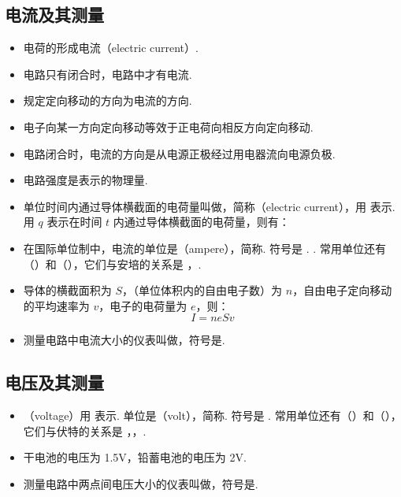 \subsection{电流及其测量}
\vspace{10pt}
\begin{itemize}
\item 电荷的形成电流（electric current）.
\item 电路只有闭合时，电路中才有电流.
\item 规定定向移动的方向为电流的方向.
\item 电子向某一方向定向移动等效于正电荷向相反方向定向移动.
\item 电路闭合时，电流的方向是从电源正极经过用电器流向电源负极.
\item 电路强度是表示的物理量.
\item 单位时间内通过导体横截面的电荷量叫做，简称（electric current），用  表示. 用 $q$ 表示在时间 $t$ 内通过导体横截面的电荷量，则有：
\item 在国际单位制中，电流的单位是（ampere），简称. 符号是 . . 常用单位还有（）和（），它们与安培的关系是 ，.
\item 导体的横截面积为 $S$，（单位体积内的自由电子数）为 $n$，自由电子定向移动的平均速率为 $v$，电子的电荷量为 $e$，则：
$$
I=neSv
$$
\item 测量电路中电流大小的仪表叫做，符号是\ammeter.
\end{itemize}

\subsection{电压及其测量}
\vspace{10pt}
\begin{itemize}
\item {}（voltage）用  表示. 单位是（volt），简称. 符号是 . 常用单位还有（）和（），它们与伏特的关系是 ，，.
\item 干电池的电压为 1.5V，铅蓄电池的电压为 2V.
\item 测量电路中两点间电压大小的仪表叫做，符号是\voltmeter.
\end{itemize}

